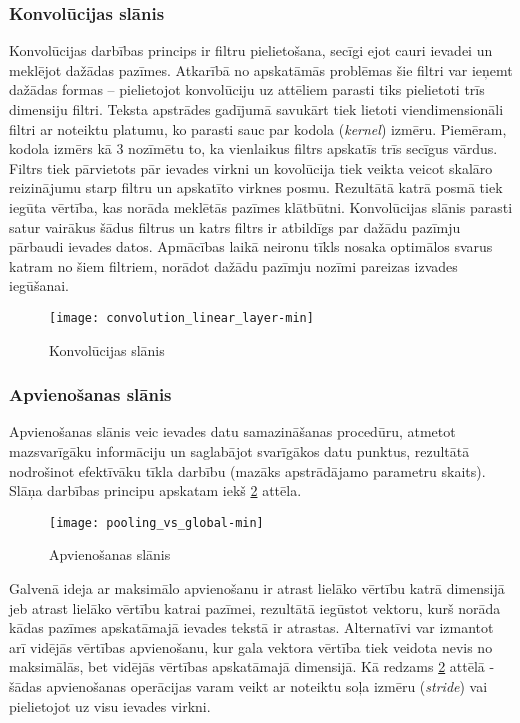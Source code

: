 \subsubsection{Konvolūcijas slānis}
Konvolūcijas darbības princips ir filtru pielietošana, secīgi ejot cauri ievadei un meklējot dažādas pazīmes. Atkarībā no apskatāmās problēmas šie filtri var ieņemt dažādas  formas – pielietojot konvolūciju uz attēliem parasti tiks pielietoti trīs dimensiju filtri. Teksta apstrādes gadījumā savukārt tiek lietoti viendimensionāli filtri ar noteiktu platumu, ko parasti sauc par kodola (\textit{kernel}) izmēru. Piemēram, kodola izmērs kā 3 nozīmētu to, ka vienlaikus filtrs apskatīs trīs secīgus vārdus. Filtrs tiek pārvietots pār ievades virkni un kovolūcija tiek veikta veicot skalāro reizinājumu starp filtru un apskatīto virknes posmu. Rezultātā katrā posmā tiek iegūta vērtība, kas norāda meklētās pazīmes klātbūtni. Konvolūcijas slānis parasti satur vairākus šādus filtrus un katrs filtrs ir atbildīgs par dažādu pazīmju pārbaudi ievades datos. Apmācības laikā neironu tīkls nosaka optimālos svarus katram no šiem filtriem, norādot dažādu pazīmju nozīmi pareizas izvades iegūšanai.

\begin{figure}[H]
	\texttt{[image: convolution\_linear\_layer-min]}
	\caption{Konvolūcijas slānis \cite{TextCNNLena}}
	\label{fig:convolution_linear_layer}
\end{figure}

\subsubsection{Apvienošanas slānis}

Apvienošanas slānis veic ievades datu samazināšanas procedūru, atmetot mazsvarīgāku informāciju un saglabājot svarīgākos datu punktus, rezultātā nodrošinot efektīvāku tīkla darbību (mazāks apstrādājamo parametru skaits). Slāņa darbības principu apskatam iekš \ref{fig:pooling_vs_global} attēla.

\begin{figure}[H]
	\texttt{[image: pooling\_vs\_global-min]}
	\caption{Apvienošanas slānis \cite{TextCNNLena}}
	\label{fig:pooling_vs_global}
\end{figure}

Galvenā ideja ar maksimālo apvienošanu ir atrast lielāko vērtību katrā dimensijā jeb atrast lielāko vērtību katrai pazīmei, rezultātā iegūstot vektoru, kurš norāda kādas pazīmes apskatāmajā ievades tekstā ir atrastas. Alternatīvi var izmantot arī vidējās vērtības apvienošanu, kur gala vektora vērtība tiek veidota nevis no maksimālās, bet vidējās vērtības apskatāmajā dimensijā. Kā redzams \ref{fig:pooling_vs_global} attēlā - šādas apvienošanas operācijas varam veikt ar noteiktu soļa izmēru (\textit{stride}) vai pielietojot uz visu ievades virkni. 


